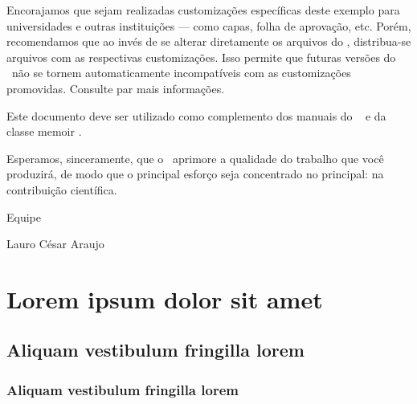 \documentclass[
	12pt,				%
	openright,			%
	twoside,			%
	a4paper,			%
	tcc,			%
	]{ABNT-CCT-UENP}
\begin{document}
Encorajamos que sejam realizadas customizações específicas deste exemplo para
universidades e outras instituições --- como capas, folha de aprovação, etc.
Porém, recomendamos que ao invés de se alterar diretamente os arquivos do
\abnTeX, distribua-se arquivos com as respectivas customizações.
Isso permite que futuras versões do \abnTeX~não se tornem automaticamente
incompatíveis com as customizações promovidas. Consulte
 par mais informações.

Este documento deve ser utilizado como complemento dos manuais do \abnTeX\ 
\cite{abntex2classe,abntex2cite,abntex2cite-alf} e da classe \textsf{memoir}
\cite{memoir}. 

Esperamos, sinceramente, que o \abnTeX\ aprimore a qualidade do trabalho que
você produzirá, de modo que o principal esforço seja concentrado no principal:
na contribuição científica.

Equipe \abnTeX 

Lauro César Araujo







\chapter{Lorem ipsum dolor sit amet}

\section{Aliquam vestibulum fringilla lorem}

\lipsum[1]

\subsection{Aliquam vestibulum fringilla lorem}
\end{document}
